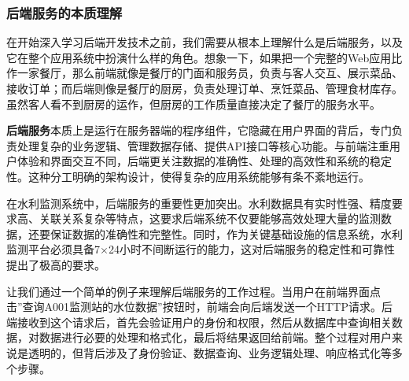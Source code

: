 \subsubsection{后端服务的本质理解}\label{ux540eux7aefux670dux52a1ux7684ux672cux8d28ux7406ux89e3}

在开始深入学习后端开发技术之前，我们需要从根本上理解什么是后端服务，以及它在整个应用系统中扮演什么样的角色。想象一下，如果把一个完整的Web应用比作一家餐厅，那么前端就像是餐厅的门面和服务员，负责与客人交互、展示菜品、接收订单；而后端则像是餐厅的厨房，负责处理订单、烹饪菜品、管理食材库存。虽然客人看不到厨房的运作，但厨房的工作质量直接决定了餐厅的服务水平。

\textbf{后端服务}本质上是运行在服务器端的程序组件，它隐藏在用户界面的背后，专门负责处理复杂的业务逻辑、管理数据存储、提供API接口等核心功能。与前端注重用户体验和界面交互不同，后端更关注数据的准确性、处理的高效性和系统的稳定性。这种分工明确的架构设计，使得复杂的应用系统能够有条不紊地运行。

在水利监测系统中，后端服务的重要性更加突出。水利数据具有实时性强、精度要求高、关联关系复杂等特点，这要求后端系统不仅要能够高效处理大量的监测数据，还要保证数据的准确性和完整性。同时，作为关键基础设施的信息系统，水利监测平台必须具备7×24小时不间断运行的能力，这对后端服务的稳定性和可靠性提出了极高的要求。

让我们通过一个简单的例子来理解后端服务的工作过程。当用户在前端界面点击''查询A001监测站的水位数据''按钮时，前端会向后端发送一个HTTP请求。后端接收到这个请求后，首先会验证用户的身份和权限，然后从数据库中查询相关数据，对数据进行必要的处理和格式化，最后将结果返回给前端。整个过程对用户来说是透明的，但背后涉及了身份验证、数据查询、业务逻辑处理、响应格式化等多个步骤。

